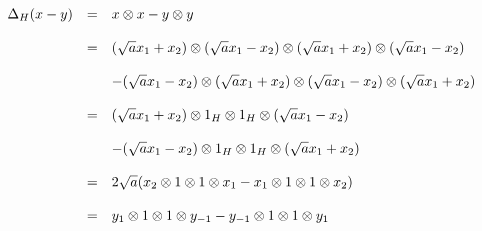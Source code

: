 $$\bao{rcl}
\Delta_H(x - y) &=& x \otimes x - y \otimes y\\
&&\\
&=& (\sqrt{a} x_1 + x_2) \otimes (\sqrt{a} x_1 - x_2) \otimes (\sqrt{a} x_1 + x_2) \otimes (\sqrt{a} x_1 - x_2)\\
&&\\
&& - (\sqrt{a} x_1 - x_2) \otimes (\sqrt{a} x_1 + x_2) \otimes (\sqrt{a} x_1 - x_2) \otimes (\sqrt{a} x_1 + x_2)\\
&&\\
&=& (\sqrt{a} x_1 + x_2) \otimes 1_H \otimes 1_H \otimes (\sqrt{a} x_1 - x_2)\\
&&\\
&& - (\sqrt{a} x_1 - x_2) \otimes 1_H \otimes 1_H \otimes (\sqrt{a} x_1 + x_2)\\
&&\\
&=& 2 \sqrt{a} (x_2 \otimes 1 \otimes 1 \otimes x_1 - x_1 \otimes 1 \otimes 1 \otimes x_2)\\
&&\\
&=& y_1 \otimes 1 \otimes 1 \otimes y_{-1} - y_{-1} \otimes 1 \otimes 1 \otimes y_1\\
\ea$$
